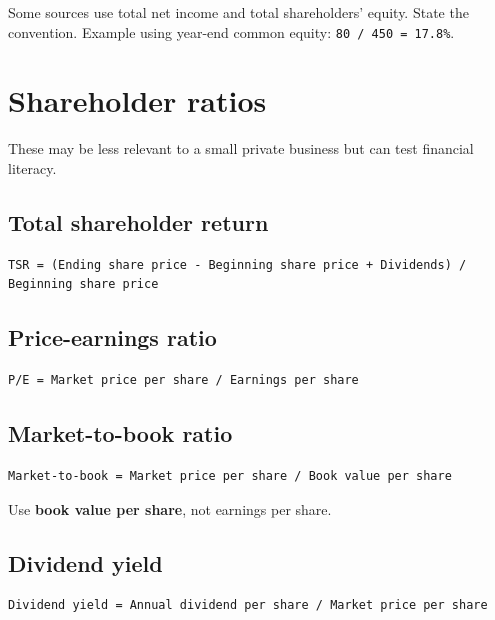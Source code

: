\documentclass[11pt,letterpaper,oneside,openany]{book}
\begin{document}
Some sources use total net income and total shareholders' equity. State the convention. Example using year-end common equity: \texttt{80 / 450 = 17.8\%}.


\section[Shareholder ratios]{Shareholder ratios}
These may be less relevant to a small private business but can test financial literacy.


\subsection[Total shareholder return]{Total shareholder return}
\begin{Verbatim}[fontsize=\small,breaklines=true,breakanywhere=true,frame=single,framesep=2mm]
TSR = (Ending share price - Beginning share price + Dividends) / Beginning share price
\end{Verbatim}

\subsection[Price-earnings ratio]{Price-earnings ratio}
\begin{Verbatim}[fontsize=\small,breaklines=true,breakanywhere=true,frame=single,framesep=2mm]
P/E = Market price per share / Earnings per share
\end{Verbatim}

\subsection[Market-to-book ratio]{Market-to-book ratio}
\begin{Verbatim}[fontsize=\small,breaklines=true,breakanywhere=true,frame=single,framesep=2mm]
Market-to-book = Market price per share / Book value per share
\end{Verbatim}

Use \textbf{book value per share}, not earnings per share.


\subsection[Dividend yield]{Dividend yield}
\begin{Verbatim}[fontsize=\small,breaklines=true,breakanywhere=true,frame=single,framesep=2mm]
Dividend yield = Annual dividend per share / Market price per share
\end{Verbatim}
\end{document}
